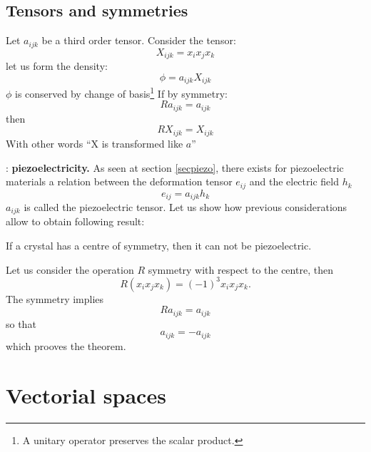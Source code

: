 \documentclass[12pt]{book}
\begin{document}
\section{Tensors and symmetries}
Let $a_{ijk}$ be a third order tensor. Consider the tensor:
\begin{equation}
X_{ijk}=x_ix_jx_k
\end{equation}
let us form the density: 
\begin{equation}
\phi=a_{ijk}X_{ijk}
\end{equation}
$\phi$ is conserved by change of basis\footnote{%
A unitary operator preserves the scalar product.}
If by symmetry:
\begin{equation}
Ra_{ijk}=a_{ijk}
\end{equation}
then
\begin{equation}
RX_{ijk}=X_{ijk}
\end{equation}
With other words ``X is transformed like
$a$''\cite{ma:tense:Bass64,ma:tense:Brillouin64}  
\begin{exmp} : {\bf piezoelectricity.}
As seen at section \ref{secpiezo}, there exists for piezoelectric materials a
relation between the deformation tensor $e_{ij}$ and the electric field $h_k$
\begin{equation}
e_{ij}=a_{ijk}h_k
\end{equation}
$a_{ijk}$ is called the piezoelectric tensor. Let us show how previous
considerations allow to obtain following result:
\begin{thm}
If a crystal has a centre of symmetry, then it can not be piezoelectric.
\end{thm}
\begin{pf}
Let us consider the operation $R$ symmetry with respect to the centre, then
\begin{equation}
R(x_ix_jx_k)=(-1)^3x_ix_jx_k.
\end{equation}
The symmetry implies
\begin{equation}
Ra_{ijk}=a_{ijk}
\end{equation}
so that
\begin{equation}
a_{ijk}=-a_{ijk}
\end{equation}
which prooves the theorem.
\end{pf}
\end{exmp}




\chapter{Vectorial spaces}
\end{document}
